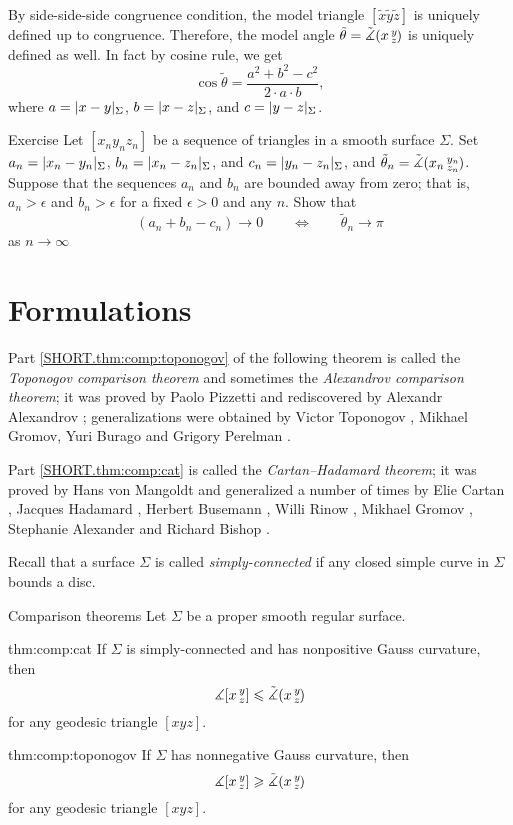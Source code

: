 By side-side-side congruence condition,
the model triangle $[\tilde x\tilde y\tilde z]$ is uniquely defined up to congruence.
Therefore, the model angle $\tilde\theta=\tilde\measuredangle(x\,{}^{y}_{z}\hspace{-0.2ex})$ is uniquely defined as well.
In fact by cosine rule, we get 
\[\cos \tilde\theta=\frac{a^2+b^2-c^2}{2\cdot a \cdot b},\]
where $a=\dist{x}{y}{\Sigma}$, $b=\dist{x}{z}{\Sigma}$, and $c=\dist{y}{z}{\Sigma}$.

\begin{thm}{Exercise}\label{ex:wide-hinges}
Let $[x_ny_nz_n]$ be a sequence of triangles in a smooth surface $\Sigma$.
Set $a_n=\dist{x_n}{y_n}{\Sigma}$,
$b_n=\dist{x_n}{z_n}{\Sigma}$,
and $c_n=\dist{y_n}{z_n}{\Sigma}$, and $\tilde\theta_n=\tilde\measuredangle(x_n\,{}^{y_n}_{z_n}\hspace{-0.2ex})$.
Suppose that the sequences $a_n$ and $b_n$ are bounded away from zero;
that is, $a_n>\epsilon$ and $b_n>\epsilon$ for a fixed $\epsilon>0$ and any $n$.
Show that
\[(a_n+b_n-c_n)\to 0\qquad\iff\qquad \tilde\theta_n\to \pi\]
as $n\to\infty$
\end{thm}

\section{Formulations}

Part \ref{SHORT.thm:comp:toponogov} of the following theorem is called the {}\emph{Toponogov comparison theorem} and sometimes the {}\emph{Alexandrov comparison theorem};
it was proved by Paolo Pizzetti \cite{pizzetti} and rediscovered by Alexandr Alexandrov \cite{aleksandrov}; 
generalizations were obtained by Victor Toponogov \cite{toponogov1957}, Mikhael Gromov, Yuri Burago and Grigory Perelman \cite{burago-gromov-perelman}.

Part \ref{SHORT.thm:comp:cat} is called the {}\emph{Cartan--Hadamard theorem};
it was proved by 
Hans von Mangoldt \cite{mangoldt} and generalized a number of times by 
Elie Cartan \cite{cartan},
Jacques Hadamard \cite{hadamard},
Herbert Busemann \cite{busemann},
Willi Rinow \cite{rinow},
Mikhael Gromov \cite[p.~119]{gromov-1987},
Stephanie Alexander and Richard Bishop \cite{alexander-bishop1990}.

Recall that a surface $\Sigma$ is called {}\emph{simply-connected} if any closed simple curve in $\Sigma$ bounds a disc.

\begin{thm}{Comparison theorems}
\label{thm:comp}
Let $\Sigma$ be a proper smooth regular surface.

\begin{subthm}{thm:comp:cat}
If $\Sigma$ is simply-connected and has nonpositive Gauss curvature,
 then 
\[\measuredangle[x\,{}^{y}_{z}]\leqslant\tilde\measuredangle(x\,{}^{y}_{z}\hspace{-0.2ex})\]
for any geodesic triangle $[xyz]$.
\end{subthm}

\begin{subthm}{thm:comp:toponogov}
If $\Sigma$ has nonnegative Gauss curvature, then 
 \[\measuredangle[x\,{}^{y}_{z}]\geqslant\tilde\measuredangle(x\,{}^{y}_{z}\hspace{-0.2ex})\]
for any geodesic triangle $[xyz]$.
\end{subthm}

\end{thm}

